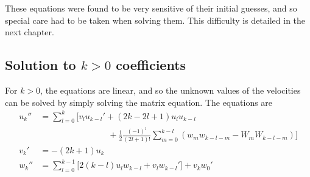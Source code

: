 \documentclass[10pt,a4paper]{report}
\begin{document}
These equations were found to be very sensitive of their initial guesses, and so special care had to be taken when solving them. This difficulty is detailed in the next chapter.

\subsection{Solution to $k > 0$ coefficients}

For $k > 0$, the equations are linear, and so the unknown values of the velocities can be solved by simply solving the matrix equation. The equations are
\begin{align*}
u_k'' &= \sum_{l=0}^k \bigg[v_l u_{k-l}' + (2k-2l+1) u_l u_{k-l} \\
& \qquad \qquad \qquad \qquad + \frac{1}{2} \frac{(-1)^l}{(2l+1)!} \sum_{m=0}^{k-l} \left(w_m w_{k-l-m} - W_m W_{k-l-m}\right) \bigg] \\
v_k' &= -(2k+1)u_k \\
w_k'' &= \sum_{l=0}^{k-1} \Big[2(k-l) u_l w_{k-l} + v_l w_{k-l}' \Big] + v_k w_0'
\end{align*}
\end{document}
